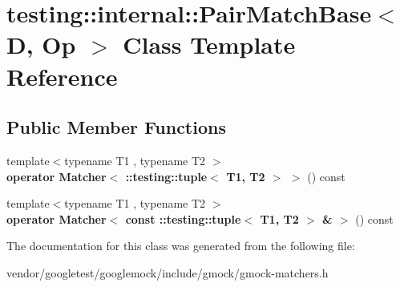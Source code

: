 \hypertarget{classtesting_1_1internal_1_1PairMatchBase}{}\section{testing\+:\+:internal\+:\+:Pair\+Match\+Base$<$ D, Op $>$ Class Template Reference}
\label{classtesting_1_1internal_1_1PairMatchBase}
\subsection*{Public Member Functions}
\begin{DoxyCompactItemize}
\item 
{\footnotesize template$<$typename T1 , typename T2 $>$ }\\{\bfseries operator Matcher$<$ \+::testing\+::tuple$<$ T1, T2 $>$ $>$} () const \hypertarget{classtesting_1_1internal_1_1PairMatchBase_a8f927cfe9008f7c35dcb03275bc69762}{}\label{classtesting_1_1internal_1_1PairMatchBase_a8f927cfe9008f7c35dcb03275bc69762}

\item 
{\footnotesize template$<$typename T1 , typename T2 $>$ }\\{\bfseries operator Matcher$<$ const \+::testing\+::tuple$<$ T1, T2 $>$ \& $>$} () const \hypertarget{classtesting_1_1internal_1_1PairMatchBase_a51667d1fc49779ceff1bbf334bfe0470}{}\label{classtesting_1_1internal_1_1PairMatchBase_a51667d1fc49779ceff1bbf334bfe0470}

\end{DoxyCompactItemize}


The documentation for this class was generated from the following file\+:\begin{DoxyCompactItemize}
\item 
vendor/googletest/googlemock/include/gmock/gmock-\/matchers.\+h\end{DoxyCompactItemize}
